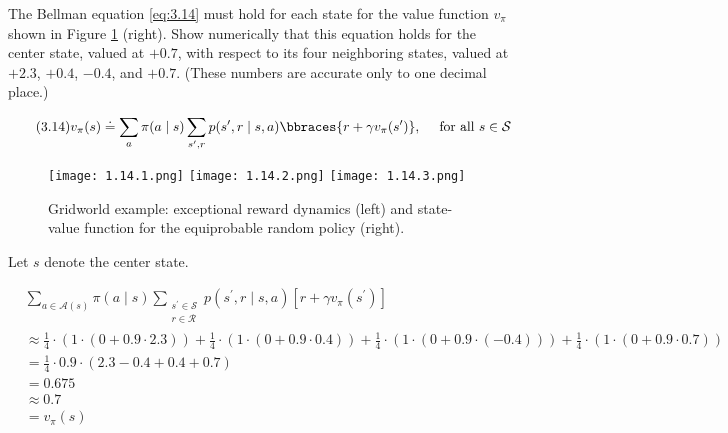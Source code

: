 
\begin{exercise}[Exercise 3.14]

The Bellman equation \eqref{eq:3.14} must hold for each state for the value function $v_\pi$ shown in Figure \ref{fig:3.2} (right). %
Show numerically that this equation holds for the center state, valued at $+0.7$, with respect to its four neighboring states, valued at $+2.3$, $+0.4$, $-0.4$, and $+0.7$.
(These numbers are accurate only to one decimal place.)

\end{exercise}


\begin{solution}

\begin{align} \label{eq:3.14} \tag{3.14}
    v_\pi(s)
    \doteq
    \sum_a
        \pi(a \mid s)
        \sum_{s^\prime, r}
            p(s^\prime, r \mid s, a)
            \bbraces{r + \gamma v_\pi(s^\prime)},
    \quad
    ~\text{for all}~ s \in \mathcal S
\end{align}

\setcounter{section}{3}
\setcounter{figure}{1}

\begin{figure}[H]
    \centering
    \subfloat
    {
        \texttt{[image: 1.14.1.png]}
    }
    \hspace{1cm}
    \subfloat
    {
        \texttt{[image: 1.14.2.png]}
    }
    \hspace{1cm}
    \subfloat
    {
        \texttt{[image: 1.14.3.png]}
    }
    \hspace{0mm}
    \caption
    {
        Gridworld example:
        exceptional reward dynamics (left) and state-value function for the equiprobable random policy (right).
    }
    \label{fig:3.2}
\end{figure}
    
Let $s$ denote the center state.

\begin{align*}
    &
    \sum_{a \in \mathcal A(s)}
        \pi(a \mid s)
        \sum_{\substack{s^\prime \in \mathcal S \\ r \in \mathcal R}}
            p(s^\prime, r \mid s, a)
            [r + \gamma v_\pi(s^\prime)] \\
    & \approx
    \frac{1}{4} \cdot (1 \cdot (0 + 0.9 \cdot 2.3))
    +
    \frac{1}{4} \cdot (1 \cdot (0 + 0.9 \cdot 0.4))
    +
    \frac{1}{4} \cdot (1 \cdot (0 + 0.9 \cdot (-0.4)))
    +
    \frac{1}{4} \cdot (1 \cdot (0 + 0.9 \cdot 0.7)) \\
    & =
    \frac{1}{4} \cdot 0.9 \cdot (2.3 - 0.4 + 0.4 + 0.7) \\
    & =
    0.675 \\
    & \approx
    0.7 \\
    & =
    v_\pi(s)
\end{align*}

\end{solution}

